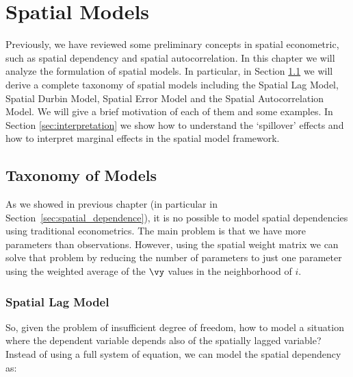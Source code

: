 \documentclass[english,12pt]{book}\usepackage[]{graphicx}\usepackage[]{xcolor}
\begin{document}
\chapter{Spatial Models}

Previously, we have reviewed some preliminary concepts in spatial econometric, such as spatial dependency and spatial autocorrelation. In this chapter we will analyze the formulation of spatial models. In particular, in Section \ref{sec:taxonomy} we will derive a complete taxonomy of spatial models including the Spatial Lag Model, Spatial Durbin Model, Spatial Error Model and the Spatial Autocorrelation Model. We will give a brief motivation of each of them and some examples.  In Section \ref{sec:interpretation} we show how to understand the `spillover' effects and how to interpret marginal effects in the spatial model framework. 

\section{Taxonomy of Models}\label{sec:taxonomy}

As we showed in previous chapter (in particular in Section~\ref{sec:spatial_dependence}), it is no possible to model spatial dependencies using traditional econometrics. The main problem is that we have more parameters than observations. However, using the spatial weight matrix we can solve that problem by reducing the number of parameters to just one parameter using the weighted average of the $\vy$ values in the neighborhood of $i$. 

\subsection{Spatial Lag Model}

So, given the problem of insufficient degree of freedom, how to model a situation where the dependent variable depends also of the spatially lagged variable? Instead of using a full system of equation, we can model the spatial dependency as:
\end{document}
